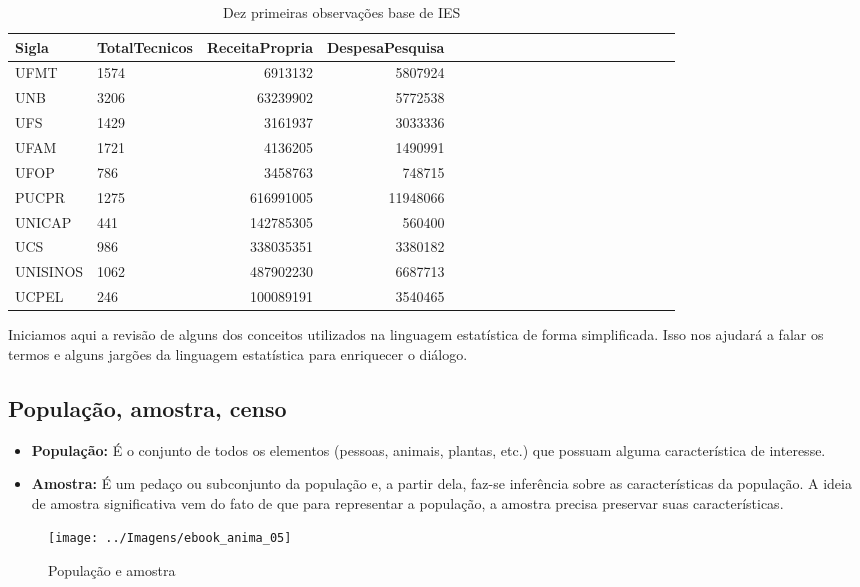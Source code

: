 \documentclass[11pt,]{style/krantz}
\theoremstyle{definition}
\theoremstyle{definition}
\theoremstyle{definition}
\theoremstyle{remark}
\begin{document}
\begin{table}[!h]

\caption{\label{tab:tab01}Dez primeiras observações base de IES}
\centering
\begin{tabular}{llrrrllrrrllrrrllrrr}
\toprule
Sigla & TotalTecnicos & ReceitaPropria & DespesaPesquisa\\
\midrule
UFMT & 1574 & 6913132 & 5807924\\
UNB & 3206 & 63239902 & 5772538\\
UFS & 1429 & 3161937 & 3033336\\
UFAM & 1721 & 4136205 & 1490991\\
UFOP & 786 & 3458763 & 748715\\
\addlinespace
PUCPR & 1275 & 616991005 & 11948066\\
UNICAP & 441 & 142785305 & 560400\\
UCS & 986 & 338035351 & 3380182\\
UNISINOS & 1062 & 487902230 & 6687713\\
UCPEL & 246 & 100089191 & 3540465\\
\bottomrule
\end{tabular}
\end{table}

Iniciamos aqui a revisão de alguns dos conceitos utilizados na linguagem estatística de forma simplificada. Isso nos ajudará a falar os termos e alguns jargões da linguagem estatística para enriquecer o diálogo.

\hypertarget{populacao-amostra-censo}{%
\subsection{População, amostra, censo}\label{populacao-amostra-censo}}

\begin{itemize}
\item
  \textbf{População:} É o conjunto de todos os elementos (pessoas, animais, plantas, etc.) que possuam alguma característica de interesse.
\item
  \textbf{Amostra:} É um pedaço ou subconjunto da população e, a partir dela, faz-se inferência sobre as características da população. A ideia de amostra significativa vem do fato de que para representar a população, a amostra precisa preservar suas características.
\end{itemize}

\begin{figure}[H]

{\centering \texttt{[image: ../Imagens/ebook\_anima\_05]} 

}

\caption{População e amostra}\label{fig:fig05}
\end{figure}
\end{document}
